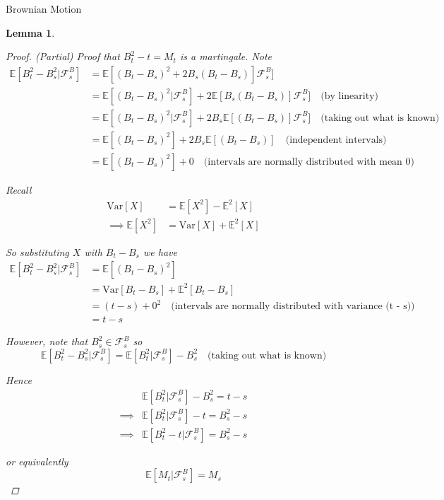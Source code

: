\documentclass[12pt]{article}
\newtheorem{lemma}{Lemma}
\begin{document}
\begin{section}{Brownian Motion}
\begin{lemma}
\begin{proof} {\em (Partial) Proof that $B^2_t - t = M_t$ is a martingale.} Note
\begin{align*}
	\mathbb E[B_t^2 - B_s^2|\mathcal F^B_s] &= \mathbb E[(B_t - B_s)^2 + 2B_s(B_t - B_s)]\mathcal F^B_s] \\
	&=  \mathbb E[(B_t - B_s)^2|\mathcal F^B_s] + 2\mathbb E[B_s(B_t - B_s)]\mathcal F^B_s] \quad \text{(by linearity)} \\
	&= \mathbb E[(B_t - B_s)^2|\mathcal F^B_s] + 2B_s\mathbb E[(B_t - B_s)]\mathcal F^B_s] \quad \text{(taking out what is known)} \\
	&= \mathbb E[(B_t - B_s)^2] + 2B_s\mathbb E[(B_t - B_s)] \quad \text{(independent intervals)} \\
	&= \mathbb E[(B_t - B_s)^2]  + 0 \quad \text{(intervals are normally distributed with mean 0)}
\end{align*}

Recall
\begin{align*}
	\text{Var}[X] &= \mathbb E[X^2] - \mathbb E^2[X] \\
	\implies \mathbb E[X^2] &= \text{Var}[X] + \mathbb E^2[X]
\end{align*}

So substituting $X$ with $B_t - B_s$ we have
\begin{align*}
	\mathbb E[B_t^2 - B_s^2|\mathcal F^B_s] &= \mathbb E[(B_t - B_s)^2] \\
	&= \text{Var}[B_t - B_s] + \mathbb E^2[B_t - B_s] \\
	&= (t - s) + 0^2 \quad \text{(intervals are normally distributed with variance (t - s))} \\
	&= t - s
\end{align*}

However, note that $B^2_s \in \mathcal F^B_s$ so
\begin{equation*}
	\mathbb E[B^2_t - B^2_s|\mathcal F^B_s] = \mathbb E[B^2_t|\mathcal F^B_s] - B^2_s \quad \text{(taking out what is known)}
\end{equation*}

Hence
\begin{align*}
	&\mathbb E[B^2_t|\mathcal F^B_s] - B^2_s = t - s \\
	\implies &\mathbb E[B^2_t|\mathcal F^B_s]  - t = B^2_s - s \\
	\implies &\mathbb E[B^2_t - t | \mathcal F^B_s] = B^2_s - s
\end{align*}

or equivalently
\begin{equation*}
	\mathbb E[M_t|\mathcal F^B_s] = M_s
\end{equation*}
\end{proof}
\end{lemma}


\end{section}
\end{document}
